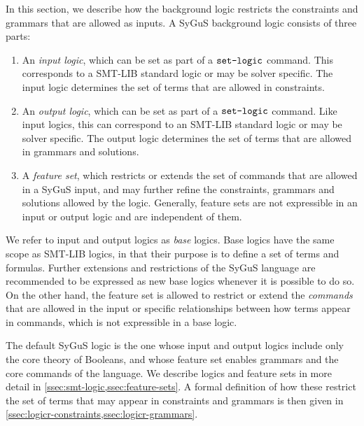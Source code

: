 \documentclass[english,a4paper,10pt]{article}
\begin{document}
In this section,
we describe how the background logic
restricts the constraints and grammars that are allowed as inputs.
A SyGuS background logic consists of three parts:
\begin{enumerate}
\item An \emph{input logic}, which can be set as part of a $\texttt{set-logic}$ command.
This corresponds to a SMT-LIB standard logic or may be solver specific.
The input logic determines the set of terms that are allowed in 
constraints.

\item An \emph{output logic}, which can be set as part of a $\texttt{set-logic}$ command.
Like input logics, this
can correspond to an SMT-LIB standard logic or may be solver specific.
The output logic determines the set of terms that are allowed in
grammars and solutions.

\item A \emph{feature set}, 
which restricts or extends the set of commands that are allowed in a SyGuS input,
and may further refine the constraints, grammars and solutions allowed by the logic.
Generally, feature sets are not expressible in an input or output logic
and are independent of them.
\end{enumerate}
We refer to input and output logics as \emph{base} logics.
Base logics have the same scope as SMT-LIB logics, in that their purpose is to
define a set of terms and formulas.
Further extensions and restrictions of the SyGuS language are recommended
to be expressed as new base logics whenever it is possible to do so.
On the other hand,
the feature set is allowed to restrict or extend the
\emph{commands} that are allowed in the input
or specific relationships between how terms appear in commands,
which is not expressible in a base logic.

The default SyGuS logic is the one
whose input and output logics include only the core theory of Booleans,
and whose feature set enables grammars and the core commands of the language.
We describe logics and feature sets
in more detail in \cref{ssec:smt-logic,ssec:feature-sets}.
A formal definition of how these
restrict the set of terms that may appear 
in constraints and grammars
is then given in \cref{ssec:logicr-constraints,ssec:logicr-grammars}.
\end{document}
